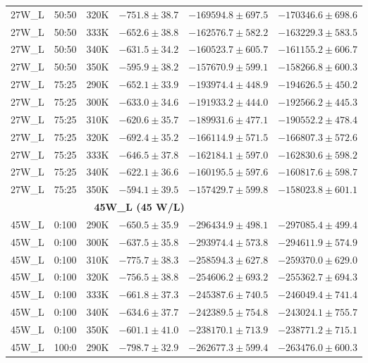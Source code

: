 \begin{longtable}{|c|c|c|c|c|c|}
27W\_L & 50:50 & 320K & $-751.8 \pm 38.7$ & $-169594.8 \pm 697.5$ & $-170346.6 \pm 698.6$ \\
27W\_L & 50:50 & 333K & $-652.6 \pm 38.8$ & $-162576.7 \pm 582.2$ & $-163229.3 \pm 583.5$ \\
27W\_L & 50:50 & 340K & $-631.5 \pm 34.2$ & $-160523.7 \pm 605.7$ & $-161155.2 \pm 606.7$ \\
27W\_L & 50:50 & 350K & $-595.9 \pm 38.2$ & $-157670.9 \pm 599.1$ & $-158266.8 \pm 600.3$ \\
27W\_L & 75:25 & 290K & $-652.1 \pm 33.9$ & $-193974.4 \pm 448.9$ & $-194626.5 \pm 450.2$ \\
27W\_L & 75:25 & 300K & $-633.0 \pm 34.6$ & $-191933.2 \pm 444.0$ & $-192566.2 \pm 445.3$ \\
27W\_L & 75:25 & 310K & $-620.6 \pm 35.7$ & $-189931.6 \pm 477.1$ & $-190552.2 \pm 478.4$ \\
27W\_L & 75:25 & 320K & $-692.4 \pm 35.2$ & $-166114.9 \pm 571.5$ & $-166807.3 \pm 572.6$ \\
27W\_L & 75:25 & 333K & $-646.5 \pm 37.8$ & $-162184.1 \pm 597.0$ & $-162830.6 \pm 598.2$ \\
27W\_L & 75:25 & 340K & $-622.1 \pm 36.6$ & $-160195.5 \pm 597.6$ & $-160817.6 \pm 598.7$ \\
27W\_L & 75:25 & 350K & $-594.1 \pm 39.5$ & $-157429.7 \pm 599.8$ & $-158023.8 \pm 601.1$ \\
\midrule \multicolumn{5}{c}{\textbf{45W\_L (45 W/L)}} \\ \midrule
45W\_L & 0:100 & 290K & $-650.5 \pm 35.9$ & $-296434.9 \pm 498.1$ & $-297085.4 \pm 499.4$ \\
45W\_L & 0:100 & 300K & $-637.5 \pm 35.8$ & $-293974.4 \pm 573.8$ & $-294611.9 \pm 574.9$ \\
45W\_L & 0:100 & 310K & $-775.7 \pm 38.3$ & $-258594.3 \pm 627.8$ & $-259370.0 \pm 629.0$ \\
45W\_L & 0:100 & 320K & $-756.5 \pm 38.8$ & $-254606.2 \pm 693.2$ & $-255362.7 \pm 694.3$ \\
45W\_L & 0:100 & 333K & $-661.8 \pm 37.3$ & $-245387.6 \pm 740.5$ & $-246049.4 \pm 741.4$ \\
45W\_L & 0:100 & 340K & $-634.6 \pm 37.7$ & $-242389.5 \pm 754.8$ & $-243024.1 \pm 755.7$ \\
45W\_L & 0:100 & 350K & $-601.1 \pm 41.0$ & $-238170.1 \pm 713.9$ & $-238771.2 \pm 715.1$ \\
45W\_L & 100:0 & 290K & $-798.7 \pm 32.9$ & $-262677.3 \pm 599.4$ & $-263476.0 \pm 600.3$ \\

\end{longtable}
